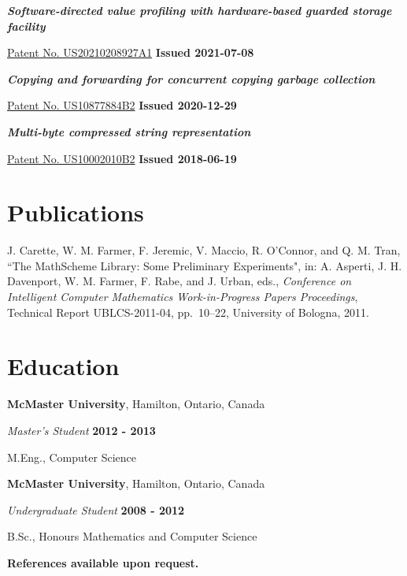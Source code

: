 \documentclass[margin,line]{res}
\begin{document}
\begin{resume}
\begin{list}{}{\leftmargin=0cm}
\item {\em \bf Software-directed value profiling with hardware-based guarded storage facility}

\href{https://patents.google.com/patent/US20210208927A1}{Patent No. US20210208927A1} \hfill {\bf Issued 2021-07-08}

\item {\em \bf Copying and forwarding for concurrent copying garbage collection}

\href{https://patents.google.com/patent/US10877884B2}{Patent No. US10877884B2} \hfill {\bf Issued 2020-12-29}

\item {\em \bf Multi-byte compressed string representation}

\href{https://patents.google.com/patent/US10002010B2}{Patent No. US10002010B2} \hfill {\bf Issued 2018-06-19}

\end{list}

\section{\sc Publications}

J. Carette, W. M. Farmer, F. Jeremic, V. Maccio, R. O'Connor, and Q. M. Tran, ``The MathScheme Library: Some
Preliminary Experiments", in: A. Asperti, J. H. Davenport, W. M. Farmer, F. Rabe, and J. Urban, eds.,
\emph{Conference on Intelligent Computer Mathematics Work-in-Progress Papers Proceedings}, Technical Report
UBLCS-2011-04, pp.~10--22, University of Bologna, 2011.

\section{\sc Education}

{\bf McMaster University}, Hamilton, Ontario, Canada

\vspace{-.3cm}

{\em Master's Student} \hfill {\bf 2012 - 2013}

\vspace{-.4cm}

M.Eng., Computer Science

{\bf McMaster University}, Hamilton, Ontario, Canada

\vspace{-.3cm}

{\em Undergraduate Student} \hfill {\bf 2008 - 2012}

\vspace{-.4cm}

B.Sc., Honours Mathematics and Computer Science

\begin{center}
\textbf{References available upon request.}
\end{center}

\end{resume}
\end{document}
